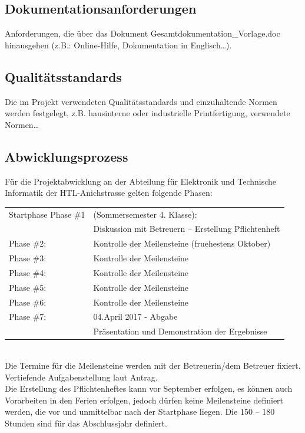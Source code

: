 \documentclass[12pt,a4paper]{article}
\newcommand{\yhbu}[0]{\color{ydkbu}}	%
\newcommand{\korr}[0]{\color{corrclr}\fontsize{8pt}{9pt}\selectfont\bf} %
\begin{document}
{ \subsection{Dokumentationsanforderungen}
	{\yhbu
	Anforderungen, die über das Dokument
	\dq{}Gesamtdokumentation\_Vorlage.doc\dq{} hinausgehen
	(z.B.: Online-Hilfe, Dokumentation in Englisch\ldots).
	}

 \subsection{Qualitätsstandards}
	{\yhbu
	Die im Projekt verwendeten Qualitätsstandards und einzuhaltende Normen
	werden festgelegt,
	z.B. hausinterne oder industrielle Printfertigung, verwendete Normen\ldots
	}

 \subsection{Abwicklungsprozess}{\yhbu
	Für die Projektabwicklung an der
	Abteilung für Elektronik und Technische Informatik der HTL-Anichstrasse
	gelten folgende Phasen:
	\\[4mm]\hspace*{-3mm}
	\begin{tabular}{p{50mm} l}
	Startphase Phase \#1
			&(Sommersemester 4. Klasse):	\\
			&Diskussion mit Betreuern -- Erstellung Pflichtenheft	\\
	Phase \#2:	&Kontrolle der Meilensteine (fruehestens Oktober)	\\
	Phase \#3:	&Kontrolle der Meilensteine	\\
	Phase \#4:	&Kontrolle der Meilensteine	\\
	Phase \#5:	&Kontrolle der Meilensteine	\\
	Phase \#6:	&Kontrolle der Meilensteine	\\
	Phase \#7:	&04.April 2017 - Abgabe		\\
			&Präsentation und Demonstration der Ergebnisse
	\end{tabular}\hfill
	\\[4mm]
	Die Termine für die Meilensteine werden mit der Betreuerin\slash{}dem Betreuer fixiert.
	\\[2mm]
	Vertiefende Aufgabenstellung laut Antrag.
	\\[2mm]
	Die Erstellung des Pflichtenheftes kann vor September erfolgen, es können auch
	Vorarbeiten in den Ferien erfolgen, jedoch dürfen keine Meilensteine definiert
	werden, die vor und unmittelbar nach der Startphase liegen. Die 150 – 180 Stunden
	sind für das Abschlussjahr definiert.
	}







}
\end{document}
